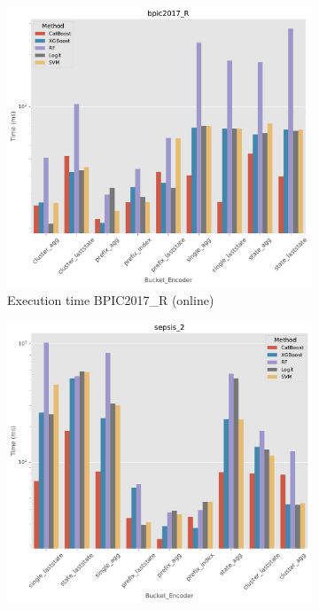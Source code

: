 \begin{figure}[!htbp] %

	\begin{subfigure}{0.48\textwidth}
		\includegraphics[width=\linewidth]{images/catboost/time/catboost/online/bpic2017_R.pdf}
		
		\caption{Execution time BPIC2017\_R (online)} \label{fig:t3}
	\end{subfigure}\hspace*{\fill}
	\begin{subfigure}{0.48\textwidth}
		\includegraphics[width=\linewidth]{images/catboost/time/catboost/online/sepsis_2.pdf}
		

\end{subfigure}
\end{figure}
